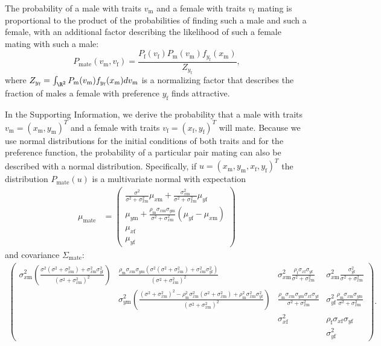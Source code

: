 \documentclass{article}
\newcommand{\x}[1]{\text{#1}}
\begin{document}
The probability of a male with traits $v_\x{m}$ and a female with traits $v_\x{f}$ mating is proportional to the product of the probabilities of finding such a male and such a female, with an additional factor describing the likelihood of such a female mating with such a male:
\begin{equation} \label{model}
P_\x{mate}(v_\x{m},v_\x{f})=\frac{P_\x{f}(v_\x{f})P_\x{m}(v_\x{m})f_{y_\x{f}}(x_\x{m})}{Z_{y_\x{f}}},
\end{equation}
where $Z_{y_\x{f}}=\int_{\R^2} P_\x{m}(v_\x{m})f_{y_\x{f}}(x_\x{m})dv_\x{m}$ is a normalizing factor that describes the fraction of males a female with preference $y_\x{f}$ finds attractive.

In the Supporting Information, we derive the probability that a male with traits $v_\x{m}=(x_\x{m},y_\x{m})^T$ and a female with traits $v_\x{f}=(x_\x{f},y_\x{f})^T$ will mate. Because we use normal distributions for the initial conditions of both traits and for the preference function, the probability of a particular pair mating can also be described with a normal distribution. Specifically, if $u=(x_\x{m},y_\x{m},x_\x{f},y_\x{f})^T$ the distribution $P_\text{mate}(u)$ is a multivariate normal with expectation 
\begin{align}
\mu_\text{mate}&=\left(\begin{array}{cc} \frac{\sigma^2}{\sigma^2+\sigma_{x\x{m}}^2}\mu_{x\x{m}}+\frac{\sigma_{x\x{m}}^2}{\sigma^2+\sigma_{x\x{m}}^2}\mu_{y\x{f}} 
\\ \mu_{y\x{m}}+\frac{\rho_\x{m}\sigma_{x\x{m}}\sigma_{y\x{m}}}{\sigma^2+\sigma_{x\x{m}}^2}(\mu_{y\x{f}}-\mu_{x\x{m}})
\\ \mu_{x\x{f}}
\\ \mu_{y\x{f}}
 \end{array}\right) \label{mean}
\end{align}
and covariance $\Sigma_\text{mate}$:
\begin{align}
\left(\begin{array}{cccc}\sigma_{x\x{m}}^2\left(\frac{\sigma^2(\sigma^2+\sigma_{x\x{m}}^2)+\sigma_{x\x{m}}^2\sigma_{y\x{f}}^2}{(\sigma^2+\sigma_{x\x{m}}^2)^2}\right) & \frac{\rho_\x{m}\sigma_{x\x{m}}\sigma_{y\x{m}}(\sigma^2(\sigma^2+\sigma_{x\x{m}}^2)+\sigma_{x\x{m}}^2\sigma_{y\x{f}}^2)}{(\sigma^2+\sigma_{x\x{m}}^2)^2} & \sigma_{x\x{m}}^2\frac{\rho_\x{f}\sigma_{x\x{f}}\sigma_{y\x{f}}}{\sigma^2+\sigma_{x\x{m}}^2} &  \sigma_{x\x{m}}^2\frac{\sigma_{y\x{f}}^2}{\sigma^2+\sigma_{x\x{m}}^2}
\\ & \sigma_{y\x{m}}^2\left(\frac{(\sigma^2+\sigma_{x\x{m}}^2)^2-\rho_\x{m}^2\sigma_{x\x{m}}^2(\sigma^2+\sigma_{x\x{m}}^2)+\rho_\x{m}^2\sigma_{x\x{m}}^2\sigma_{y\x{f}}^2}{(\sigma^2+\sigma_{x\x{m}}^2)^2}\right) & \frac{\rho_\x{m}\sigma_{x\x{m}}\sigma_{y\x{m}}\sigma_{x\x{f}}\sigma_{y\x{f}}}{\sigma^2+\sigma_{x\x{m}}^2}& \sigma_{y\x{f}}^2\frac{\rho_\x{m}\sigma_{x\x{m}}\sigma_{y\x{m}}}{\sigma^2+\sigma_{x\x{m}}^2}
\\ & & \sigma_{x\x{f}}^2 & \rho_\x{f}\sigma_{x\x{f}}\sigma_{y\x{f}}
\\ & & & \sigma_{y\x{f}}^2
\end{array}\right). \label{covariance}
\end{align}
\end{document}
